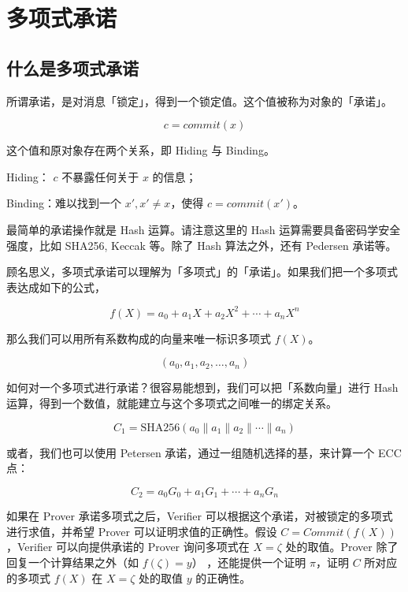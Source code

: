 \hypertarget{ux7406ux89e3-plonkux4e94ux591aux9879ux5f0fux627fux8bfa}{%
\chapter{多项式承诺}\label{ux7406ux89e3-plonkux4e94ux591aux9879ux5f0fux627fux8bfa}}

\hypertarget{ux4ec0ux4e48ux662fux591aux9879ux5f0fux627fux8bfa}{%
\section{什么是多项式承诺}\label{ux4ec0ux4e48ux662fux591aux9879ux5f0fux627fux8bfa}}

所谓承诺，是对消息「锁定」，得到一个锁定值。这个值被称为对象的「承诺」。

\[
c = commit(x)
\]

这个值和原对象存在两个关系，即 Hiding 与 Binding。

Hiding： \(c\) 不暴露任何关于 \(x\) 的信息；

Binding：难以找到一个 \(x', x'\neq x\)，使得 \(c=commit(x')\)。

最简单的承诺操作就是 Hash 运算。请注意这里的 Hash
运算需要具备密码学安全强度，比如 SHA256, Keccak 等。除了 Hash
算法之外，还有 Pedersen 承诺等。

顾名思义，多项式承诺可以理解为「多项式」的「承诺」。如果我们把一个多项式表达成如下的公式，

\[
f(X) = a_0 + a_1X + a_2X^2 + \cdots + a_nX^n
\]

那么我们可以用所有系数构成的向量来唯一标识多项式 \(f(X)\)。

\[
(a_0, a_1, a_2,\ldots, a_n)
\]

如何对一个多项式进行承诺？很容易能想到，我们可以把「系数向量」进行 Hash
运算，得到一个数值，就能建立与这个多项式之间唯一的绑定关系。

\[
C_1 = \textrm{SHA256}(a_0\parallel a_1 \parallel a_2 \parallel \cdots \parallel a_n)
\]

或者，我们也可以使用 Petersen 承诺，通过一组随机选择的基，来计算一个 ECC
点：

\[
C_2 = a_0 G_0 + a_1  G_1 + \cdots + a_n G_n
\]

如果在 Prover 承诺多项式之后，Verifier
可以根据这个承诺，对被锁定的多项式进行求值，并希望 Prover
可以证明求值的正确性。假设 \(C=Commit(f(X))\)，Verifier 可以向提供承诺的
Prover 询问多项式在 \(X=\zeta\) 处的取值。Prover
除了回复一个计算结果之外（如 \(f(\zeta) = y\)） ，还能提供一个证明
\(\pi\)，证明 \(C\) 所对应的多项式 \(f(X)\) 在 \(X=\zeta\) 处的取值
\(y\) 的正确性。

